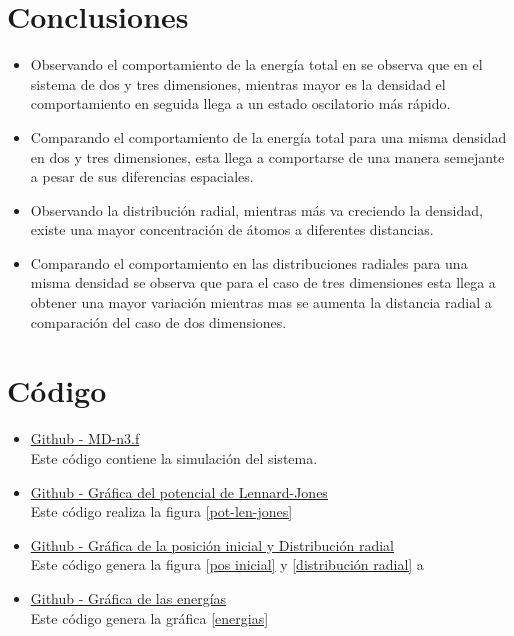 \documentclass[reprint,amsmath,amssymb,aps,]{revtex4-2}
\begin{document}
\section{Conclusiones}
\begin{itemize}
    \item Observando el comportamiento de la energía total en se observa que en el sistema de dos y tres dimensiones, mientras mayor es la densidad el comportamiento en seguida llega a un estado oscilatorio más rápido.
    \item Comparando el comportamiento de la energía total para una misma densidad en dos y tres dimensiones, esta llega a comportarse de una manera semejante a pesar de sus diferencias espaciales.
    \item Observando la distribución  radial, mientras más va creciendo la densidad, existe una mayor concentración de átomos a diferentes distancias.
    \item Comparando el comportamiento en las distribuciones radiales para una misma densidad se observa que para el caso de tres dimensiones esta llega a obtener una mayor variación mientras mas se aumenta la distancia radial a comparación del caso de dos dimensiones.
\end{itemize}
\section{Código}
\begin{itemize}
\item \href{https://github.com/giovannilopez9808/Notas_Agosto_2020/blob/master/Simulaciones/Proyecto_1/Scripts/MD-n3.f}{Github - MD-n3.f}\\
Este código contiene la simulación del sistema.
\item \href{https://github.com/giovannilopez9808/Notas_Agosto_2020/blob/master/Simulaciones/Proyecto_1/Scripts/Potencial_Graphics.py}{Github - Gráfica del potencial de Lennard-Jones}\\
Este código realiza la figura \ref{pot-len-jones}
\item \href{https://github.com/giovannilopez9808/Notas_Agosto_2020/blob/master/Simulaciones/Proyecto_1/Scripts/Cor_Graphics.py}{Github - Gráfica de la posición inicial y Distribución radial}\\
Este código genera la figura \ref{pos inicial} y \ref{distribución radial} a
\item \href{https://github.com/giovannilopez9808/Notas_Agosto_2020/blob/master/Simulaciones/Proyecto_1/Scripts/Energy_Graphics.py}{Github - Gráfica de las energías}\\
Este código genera la gráfica \ref{energias}
\end{itemize}
\nocite{*}

\end{document}
